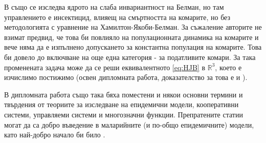 В \cite{DeLara2016} също се изследва ядрото на слаба инвариантност на Белман, но там управлението е инсектицид, влияещ на смъртността на комарите, но без методологията \cite{Zidani2013} с уравнение на Хамилтон-Якоби-Белман.
За съжаление авторите не взимат предвид, че това би повлияло на популационната динамика на комарите и вече няма да е изпълнено допускането за константна популация на комарите.
Това би довело до включване на още една категория - за податливите комари.
За така променената задача може да се реши еквивалентното \eqref{eq:HJB} в $\mathbb{R}^3$, което е изчислимо постижимо (освен дипломната работа, доказателство за това е и \cite{Rashkov2021}).

В дипломната работа също така бяха поместени и някои основни термини и твърдения от теориите за изследване на епидемични модели, кооперативни системи, управляеми системи и многозначни функции.
Препратените статии могат да са добро въведение в маларийните (и по-общо епидемичните) модели, като най-добро начало би било \cite{Smith2012}.
